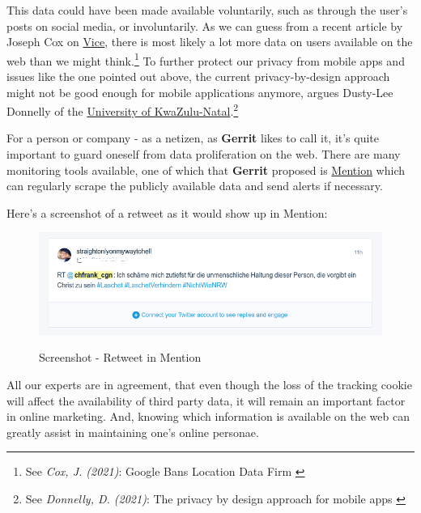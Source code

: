 This data could have been made available voluntarily, such as through the user's posts on social media, or involuntarily. As we can guess from a recent article by Joseph Cox on \href{https://www.vice.com/en}{Vice}, there is most likely a lot more data on users available on the web than we might think.\footnote{See \textit{Cox, J. (2021)}: Google Bans Location Data Firm \cite{locationBan}} To further protect our privacy from mobile apps and issues like the one pointed out above, the current privacy-by-design approach might not be good enough for mobile applications anymore, argues Dusty-Lee Donnelly of the \href{https://ukzn.ac.za/}{University of KwaZulu-Natal}.\footnote{See \textit{Donnelly, D. (2021)}: The privacy by design approach for mobile apps \cite{privacyDesign}}

For a person or company - as a netizen, as \textbf{Gerrit} likes to call it, it's quite important to guard oneself from data proliferation on the web. There are many monitoring tools available, one of which that \textbf{Gerrit} proposed is \href{https://mention.com/en/}{Mention} which can regularly scrape the publicly available data and send alerts if necessary. 

Here's a screenshot of a retweet as it would show up in Mention:

\begin{figure}[H]
\centering
\caption {Screenshot - Retweet in Mention}
\includegraphics[width=\linewidth]{images/retweet-mention.png}
\label{fig:retweet}
\end{figure}

All our experts are in agreement, that even though the loss of the tracking cookie will affect the availability of third party data, it will remain an important factor in online marketing. And, knowing which information is available on the web can greatly assist in maintaining one's online personae.
